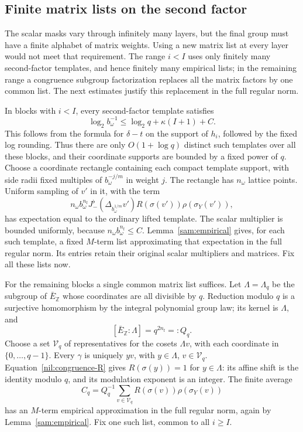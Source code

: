 \subsection{Finite matrix lists on the second factor}

The scalar masks vary through infinitely many layers, but the final group
must have a finite alphabet of matrix weights. Using a new matrix list at
every layer would not meet that requirement. The range \(i<I\) uses only finitely many second-factor templates, and hence finitely many empirical lists; in the remaining range a congruence
subgroup factorization replaces all the matrix factors by one common list.
The next estimates justify this replacement in the full regular norm.


In blocks with \(i<I\), every second-factor template satisfies
\begin{equation}\label{sam:ordinary-range}
 \log_2 b_\omega^{-1}
 \le \log_2q+\kappa(I+1)+C.
\end{equation}
This follows from the formula for \(\delta-t\) on the support of
\(h_i\), followed by the fixed log rounding.  Thus there are only
\(O(1+\log q)\) distinct such templates over all these blocks, and
their coordinate supports are bounded by a fixed power of \(q\).
Choose a coordinate rectangle containing each compact template
support, with side radii fixed multiples of
\(b_\omega^{-j/m}\) in weight \(j\).  The rectangle has
\(n_\omega\) lattice points.  Uniform sampling of \(v'\) in it,
with the term
\[
 n_\omega b_\omega^{n_{\mathrm f}}
 J_-^\flat(\Delta_{b_\omega^{1/m}}v')
 R(\sigma(v'))\rho(\sigma_Y(v')),
\]
has expectation equal to the ordinary lifted template.  The scalar
multiplier is bounded uniformly, because
\(n_\omega b_\omega^{n_{\mathrm f}}\le C\).
Lemma~\ref{sam:empirical} gives, for each such template, a fixed
\(M\)-term list approximating that expectation in the full regular
norm.  Its entries retain their original scalar multipliers and
matrices.  Fix all these lists now.

For the remaining blocks a single common matrix list suffices.  Let
\(\Lambda=\Lambda_q\) be the subgroup of \(\bar E_{\mathbb Z}\) whose
coordinates are all divisible by \(q\).  Reduction modulo \(q\)
is a surjective homomorphism by the integral polynomial group law;
its kernel is \(\Lambda\), and
\begin{equation}\label{sam:index}
 [\bar E_{\mathbb Z}:\Lambda]=q^{2n_{\mathrm f}}=:Q_q.
\end{equation}
Choose a set \(\mathcal V_q\) of representatives for the cosets
\(\Lambda v\), with each coordinate in
\(\{0,\ldots,q-1\}\).  Every \(\gamma\) is uniquely \(yv\),
with \(y\in\Lambda\), \(v\in\mathcal V_q\).
Equation~\eqref{nil:congruence-R} gives
\(R(\sigma(y))=1\) for \(y\in\Lambda\): its affine shift is
the identity modulo \(q\), and its modulation exponent is an
integer.  The finite average
\begin{equation}\label{sam:coset-average}
 C_q=Q_q^{-1}\sum_{v\in\mathcal V_q}
 R(\sigma(v))\rho(\sigma_Y(v))
\end{equation}
has an \(M\)-term empirical approximation in the full regular norm,
again by Lemma~\ref{sam:empirical}.  Fix one such list, common to
all \(i\ge I\).

